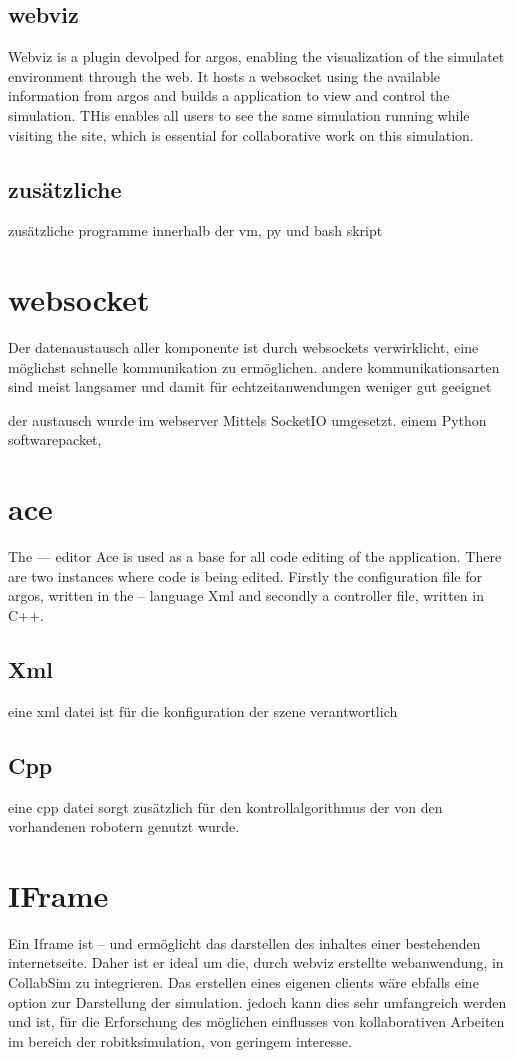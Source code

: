 \documentclass[german,version-2020-11]{uzl-thesis}
\begin{document}
  \subsection{webviz}
  Webviz is a plugin devolped for argos, enabling the visualization of the simulatet environment through the web. 
  It hosts a websocket using the available information from argos and builds a application to view and control the simulation. 
  THis enables all users to see the same simulation running while visiting the site, which is essential for collaborative work on this simulation.

  \subsection{zusätzliche}
  zusätzliche programme innerhalb der vm, py und bash skript




\section{websocket}
Der datenaustausch aller komponente ist durch websockets verwirklicht, eine möglichst schnelle kommunikation zu ermöglichen. 
andere kommunikationsarten sind meist langsamer und damit für echtzeitanwendungen weniger gut geeignet

der austausch wurde im webserver Mittels SocketIO umgesetzt. einem Python softwarepacket,
\section{ace}
The --- editor Ace is used as a base for all code editing of the application.
There are two instances where code is being edited. Firstly the configuration file for argos, written in the -- language Xml and secondly a controller file, written in C++.   

\subsection{Xml} 
     eine xml datei ist für die konfiguration der szene verantwortlich
\subsection{Cpp}
      eine cpp datei sorgt zusätzlich für den kontrollalgorithmus der von den vorhandenen robotern genutzt wurde.


\section{IFrame}
Ein Iframe ist -- und ermöglicht das darstellen des inhaltes einer bestehenden internetseite. 
Daher ist er ideal um die, durch webviz erstellte webanwendung, in CollabSim zu integrieren.
Das erstellen eines eigenen clients wäre ebfalls eine option zur Darstellung der simulation. 
jedoch kann dies sehr umfangreich werden und ist, für die Erforschung des möglichen einflusses von 
kollaborativen Arbeiten im bereich der robitksimulation, von geringem interesse.
\end{document}
